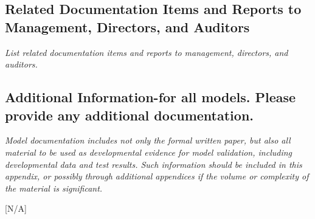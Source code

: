 \documentclass[12pt,letterpaper]{article}
\begin{document}
\subsection{Related Documentation Items and Reports to Management, Directors, and Auditors}
\textit{List related documentation items and reports to management, directors, and auditors.}

\subsection{Additional Information-for all models. Please provide any additional documentation.}
\textit{Model documentation includes not only the formal written paper, but also all material to be used as developmental evidence for model validation, including developmental data and test results. Such information should be included in this appendix, or possibly through additional appendices if the volume or complexity of the material is significant.}

[N/A]
\end{document}
